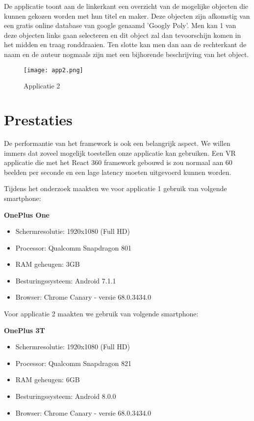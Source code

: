 De applicatie toont aan de linkerkant een overzicht van de mogelijke objecten die kunnen gekozen worden met hun titel en maker. Deze objecten zijn afkomstig van een gratis online database van google genaamd 'Googly Poly'. Men kan 1 van deze objecten links gaan selecteren en dit object zal dan tevoorschijn komen in het midden en traag ronddraaien. Ten slotte kan men dan aan de rechterkant de naam en de auteur nogmaals zijn met een bijhorende beschrijving van het object.

\begin{figure}[H]
	\centering
	\texttt{[image: app2.png]}
	\caption{Applicatie 2}
	\label{fig:app2}
\end{figure}

\section{Prestaties}
\label{sec:prestaties}
De performantie van het framework is ook een belangrijk aspect. We willen immers dat zoveel mogelijk toestellen onze applicatie kan gebruiken. Een VR applicatie die met het React 360 framework gebouwd is zou normaal aan 60 beelden per seconde en een lage latency moeten uitgevoerd kunnen worden.

Tijdens het onderzoek maakten we voor applicatie 1 gebruik van volgende smartphone:

\textbf{OnePlus One }
\begin{itemize}
	\item Schermresolutie: 1920x1080 (Full HD)
	\item Processor: Qualcomm Snapdragon 801
	\item RAM geheugen: 3GB
	\item Besturingssysteem: Android 7.1.1
	\item Browser: Chrome Canary - versie 68.0.3434.0
\end{itemize}

Voor applicatie 2 maakten we gebruik van volgende smartphone:

\textbf{OnePlus 3T}
\begin{itemize}
	\item Schermresolutie: 1920x1080 (Full HD)
	\item Processor: Qualcomm Snapdragon 821
	\item RAM geheugen: 6GB
	\item Besturingssysteem: Android 8.0.0
	\item Browser: Chrome Canary - versie 68.0.3434.0
\end{itemize}

